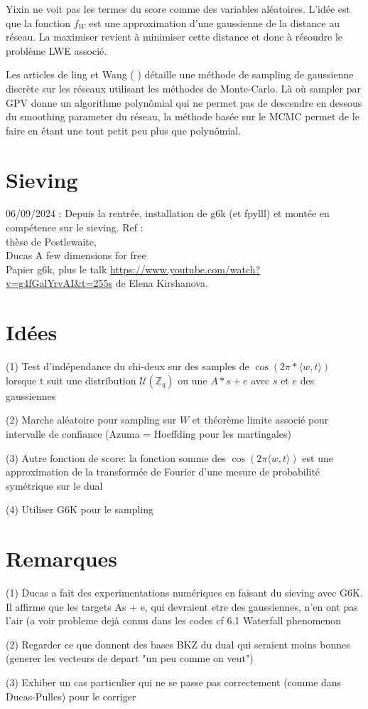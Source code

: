 \documentclass{article}
\begin{document}
Yixin ne voit pas les termes du score comme des variables aléatoires. L'idée est que la fonction $f_W$ est une approximation d'une gaussienne de la distance au réseau. La maximiser revient à minimiser cette distance et donc à résoudre le problème LWE associé.
 
Les articles de ling et Wang (\cite{wang2017geometric} \cite{wang2019lattice}) détaille une méthode de sampling de gaussienne discrète sur les réseaux utilisant les méthodes de Monte-Carlo. Là où sampler par GPV donne un algorithme polynômial qui ne permet pas de descendre en dessous du smoothing parameter du réseau, la méthode basée sur le MCMC permet de le faire en étant une tout petit peu plus que polynômial.
 
\section{Sieving}
 
06/09/2024 : Depuis la rentrée, installation de g6k (et fpylll) et montée en compétence sur le sieving. 
Ref : \\
thèse de Postlewaite, \\
Ducas A few dimensions for free\\
Papier g6k, 
plus le talk \url{https://www.youtube.com/watch?v=g4fGalYrvAI&t=255s} de Elena Kirshanova.

\section{Idées}

(1) Test d'indépendance du chi-deux sur des samples de $\cos(2  \pi * \langle w , t \rangle)$ lorsque t suit une distribution $\mathcal U(\mathbb Z_q)$ ou une $A * s + e$ avec $s$ et $e$ des gaussiennes 
 
(2) Marche aléatoire pour sampling sur $W$ et théorème limite associé pour intervalle de confiance (Azuma = Hoeffding pour les martingales) 
 
(3) Autre fonction de score: la fonction somme des $\cos(2 \pi \langle w,t\rangle )$ est une approximation de la transformée de Fourier d'une mesure de probabilité symétrique sur le dual

(4) Utiliser G6K pour le sampling

\section{Remarques}   

(1) Ducas a fait des experimentations numériques en faisant du sieving avec G6K. Il affirme que les targets As + e, qui devraient etre des gaussiennes, n'en ont pas l'air (a voir probleme dejà connu dans les codes cf 6.1 Waterfall phenomenon

(2) Regarder ce que donnent des bases BKZ du dual qui seraient moins bonnes (generer les vecteurs de depart "un peu comme on veut")

(3) Exhiber un cas particulier qui ne se passe pas correctement (comme dans Ducas-Pulles) pour le corriger



\end{document}
